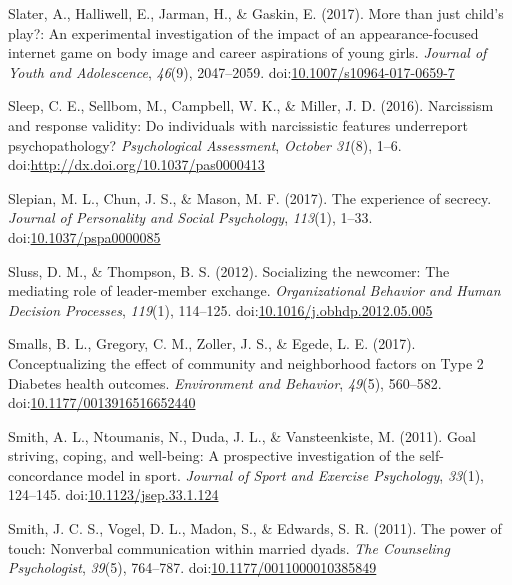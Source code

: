 \documentclass[english,man]{apa6}
\begin{document}
\hypertarget{ref-Slater2017}{}
Slater, A., Halliwell, E., Jarman, H., \& Gaskin, E. (2017). More than
just child's play?: An experimental investigation of the impact of an
appearance-focused internet game on body image and career aspirations of
young girls. \emph{Journal of Youth and Adolescence}, \emph{46}(9),
2047--2059.
doi:\href{https://doi.org/10.1007/s10964-017-0659-7}{10.1007/s10964-017-0659-7}

\hypertarget{ref-Sleep2016}{}
Sleep, C. E., Sellbom, M., Campbell, W. K., \& Miller, J. D. (2016).
Narcissism and response validity: Do individuals with narcissistic
features underreport psychopathology? \emph{Psychological Assessment},
\emph{October 31}(8), 1--6.
doi:\href{https://doi.org/http://dx.doi.org/10.1037/pas0000413}{http://dx.doi.org/10.1037/pas0000413}

\hypertarget{ref-Slepian2017}{}
Slepian, M. L., Chun, J. S., \& Mason, M. F. (2017). The experience of
secrecy. \emph{Journal of Personality and Social Psychology},
\emph{113}(1), 1--33.
doi:\href{https://doi.org/10.1037/pspa0000085}{10.1037/pspa0000085}

\hypertarget{ref-Sluss2012}{}
Sluss, D. M., \& Thompson, B. S. (2012). Socializing the newcomer: The
mediating role of leader-member exchange. \emph{Organizational Behavior
and Human Decision Processes}, \emph{119}(1), 114--125.
doi:\href{https://doi.org/10.1016/j.obhdp.2012.05.005}{10.1016/j.obhdp.2012.05.005}

\hypertarget{ref-Smalls2017}{}
Smalls, B. L., Gregory, C. M., Zoller, J. S., \& Egede, L. E. (2017).
Conceptualizing the effect of community and neighborhood factors on Type
2 Diabetes health outcomes. \emph{Environment and Behavior},
\emph{49}(5), 560--582.
doi:\href{https://doi.org/10.1177/0013916516652440}{10.1177/0013916516652440}

\hypertarget{ref-Smith2011a}{}
Smith, A. L., Ntoumanis, N., Duda, J. L., \& Vansteenkiste, M. (2011).
Goal striving, coping, and well-being: A prospective investigation of
the self-concordance model in sport. \emph{Journal of Sport and Exercise
Psychology}, \emph{33}(1), 124--145.
doi:\href{https://doi.org/10.1123/jsep.33.1.124}{10.1123/jsep.33.1.124}

\hypertarget{ref-Smith2011}{}
Smith, J. C. S., Vogel, D. L., Madon, S., \& Edwards, S. R. (2011). The
power of touch: Nonverbal communication within married dyads. \emph{The
Counseling Psychologist}, \emph{39}(5), 764--787.
doi:\href{https://doi.org/10.1177/0011000010385849}{10.1177/0011000010385849}
\end{document}

